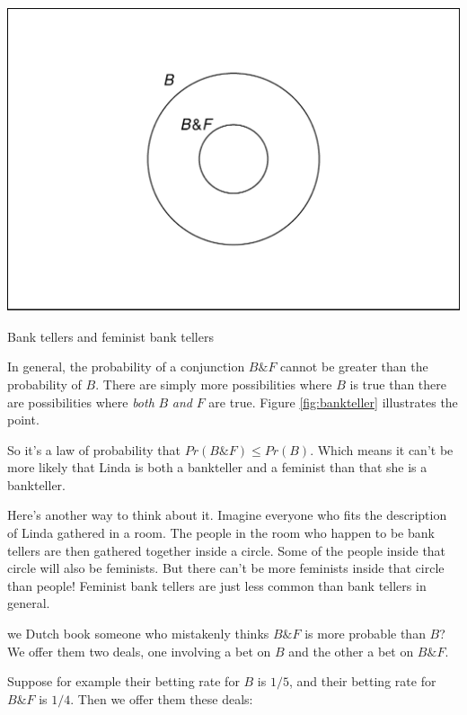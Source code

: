 \documentclass[justified]{tufte-book}
\renewcommand{\wedge}{\mathbin{\&}}
\newcommand{\p}{Pr}
\theoremstyle{definition}
\theoremstyle{definition}
\theoremstyle{definition}
\theoremstyle{definition}
\theoremstyle{remark}
\begin{document}
\begin{marginfigure}
\includegraphics{_main_files/figure-latex/bankteller-1} \caption[Bank tellers and feminist bank tellers]{Bank tellers and feminist bank tellers}\label{fig:bankteller}
\end{marginfigure}

In general, the probability of a conjunction \(B \wedge F\) cannot be greater than the probability of \(B\). There are simply more possibilities where \(B\) is true than there are possibilities where \emph{both} \(B\) \emph{and} \(F\) are true. Figure \ref{fig:bankteller} illustrates the point.

So it's a law of probability that \(\p(B \wedge F) \leq \p(B)\). Which means it can't be more likely that Linda is both a bankteller and a feminist than that she is a bankteller.

Here's another way to think about it. Imagine everyone who fits the description of Linda gathered in a room. The people in the room who happen to be bank tellers are then gathered together inside a circle. Some of the people inside that circle will also be feminists. But there can't be more feminists inside that circle than people! Feminist bank tellers are just less common than bank tellers in general.

 we Dutch book someone who mistakenly thinks \(B \wedge F\) is more probable than \(B\)? We offer them two deals, one involving a bet on \(B\) and the other a bet on \(B \wedge F\).

Suppose for example their betting rate for \(B\) is \(1/5\), and their betting rate for \(B \wedge F\) is \(1/4\). Then we offer them these deals:
\end{document}
